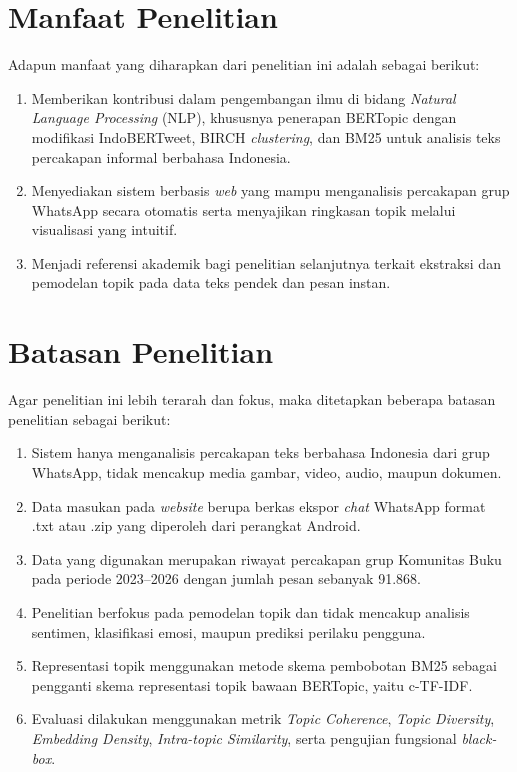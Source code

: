 \section{Manfaat Penelitian}
\label{sec:intro-benefits}

\noindent Adapun manfaat yang diharapkan dari penelitian ini adalah sebagai berikut:

\begin{enumerate}[nosep]
	\item Memberikan kontribusi dalam pengembangan ilmu di bidang \textit{Natural Language Processing} (NLP), khususnya penerapan BERTopic dengan modifikasi IndoBERTweet, BIRCH \textit{clustering}, dan BM25 untuk analisis teks percakapan informal berbahasa Indonesia.
	\item Menyediakan sistem berbasis \textit{web} yang mampu menganalisis percakapan grup WhatsApp secara otomatis serta menyajikan ringkasan topik melalui visualisasi yang intuitif.
	\item Menjadi referensi akademik bagi penelitian selanjutnya terkait ekstraksi dan pemodelan topik pada data teks pendek dan pesan instan.
\end{enumerate}

\section{Batasan Penelitian}
\label{sec:intro-scope}

\noindent Agar penelitian ini lebih terarah dan fokus, maka ditetapkan beberapa batasan penelitian sebagai berikut:

\begin{enumerate}[nosep]
	\item Sistem hanya menganalisis percakapan teks berbahasa Indonesia dari grup WhatsApp, tidak mencakup media gambar, video, audio, maupun dokumen.
	\item Data masukan pada \textit{website} berupa berkas ekspor \textit{chat} WhatsApp format .txt atau .zip yang diperoleh dari perangkat Android.
	\item Data yang digunakan merupakan riwayat percakapan grup Komunitas Buku pada periode 2023--2026 dengan jumlah pesan sebanyak 91.868.
	\item Penelitian berfokus pada pemodelan topik dan tidak mencakup analisis sentimen, klasifikasi emosi, maupun prediksi perilaku pengguna.
	\item Representasi topik menggunakan metode skema pembobotan BM25 sebagai pengganti skema representasi topik bawaan BERTopic, yaitu c-TF-IDF.
	\item Evaluasi dilakukan menggunakan metrik \textit{Topic Coherence}, \textit{Topic Diversity}, \textit{Embedding Density}, \textit{Intra-topic Similarity}, serta pengujian fungsional \textit{black-box}.
\end{enumerate}



